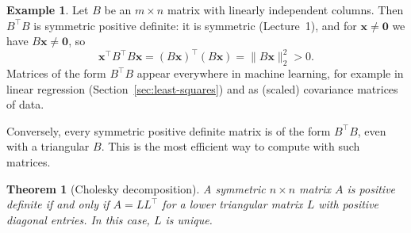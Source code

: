 \documentclass[11pt]{article}
\newcommand{\norm}[1]{\lVert #1 \rVert}
\theoremstyle{definition}
\newtheorem{example}[definition]{Example}
\theoremstyle{plain}
\newtheorem{theorem}[definition]{Theorem}
\theoremstyle{remark}
\begin{document}
\begin{example}\label{ex:BTB}
    Let $B$ be an $m \times n$ matrix with linearly independent columns. Then $B^\top B$ is symmetric positive definite: it is symmetric (Lecture~1), and for $\mathbf{x} \neq \mathbf{0}$ we have $B\mathbf{x} \neq \mathbf{0}$, so
    \[\mathbf{x}^\top B^\top B \mathbf{x} = (B\mathbf{x})^\top (B\mathbf{x}) = \norm{B\mathbf{x}}_2^2 > 0.\]
    Matrices of the form $B^\top B$ appear everywhere in machine learning, for example in linear regression (Section~\ref{sec:least-squares}) and as (scaled) covariance matrices of data.
\end{example}

Conversely, every symmetric positive definite matrix is of the form $B^\top B$, even with a triangular $B$. This is the most efficient way to compute with such matrices.

\begin{theorem}[Cholesky decomposition]\label{thm:cholesky}
    A symmetric $n \times n$ matrix $A$ is positive definite if and only if $A = LL^\top$ for a lower triangular matrix $L$ with positive diagonal entries. In this case, $L$ is unique.
\end{theorem}
\end{document}

